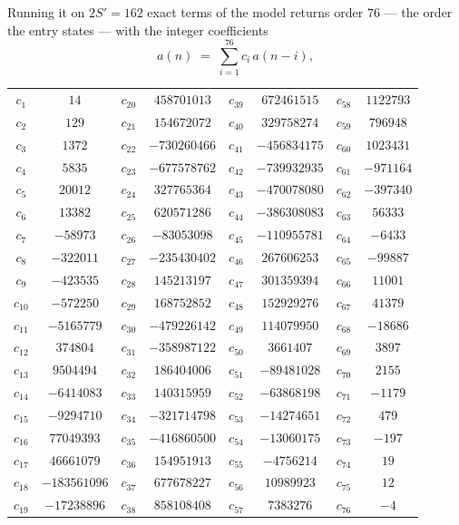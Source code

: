 \documentclass[11pt,a4paper]{article}
\theoremstyle{plain}
\theoremstyle{definition}
\begin{document}
Running it on $2S'=162$ exact terms of the model returns order $76$ --- the order the
entry states --- with the integer coefficients
\[
a(n)\;=\;\sum_{i=1}^{76}c_i\,a(n-i),
\]
\begin{center}\small
\begin{tabular}{cccccccc}
$c_{1}$ & $14$ & $c_{20}$ & $458701013$ & $c_{39}$ & $672461515$ & $c_{58}$ & $1122793$ \\
$c_{2}$ & $129$ & $c_{21}$ & $154672072$ & $c_{40}$ & $329758274$ & $c_{59}$ & $796948$ \\
$c_{3}$ & $1372$ & $c_{22}$ & $-730260466$ & $c_{41}$ & $-456834175$ & $c_{60}$ & $1023431$ \\
$c_{4}$ & $5835$ & $c_{23}$ & $-677578762$ & $c_{42}$ & $-739932935$ & $c_{61}$ & $-971164$ \\
$c_{5}$ & $20012$ & $c_{24}$ & $327765364$ & $c_{43}$ & $-470078080$ & $c_{62}$ & $-397340$ \\
$c_{6}$ & $13382$ & $c_{25}$ & $620571286$ & $c_{44}$ & $-386308083$ & $c_{63}$ & $56333$ \\
$c_{7}$ & $-58973$ & $c_{26}$ & $-83053098$ & $c_{45}$ & $-110955781$ & $c_{64}$ & $-6433$ \\
$c_{8}$ & $-322011$ & $c_{27}$ & $-235430402$ & $c_{46}$ & $267606253$ & $c_{65}$ & $-99887$ \\
$c_{9}$ & $-423535$ & $c_{28}$ & $145213197$ & $c_{47}$ & $301359394$ & $c_{66}$ & $11001$ \\
$c_{10}$ & $-572250$ & $c_{29}$ & $168752852$ & $c_{48}$ & $152929276$ & $c_{67}$ & $41379$ \\
$c_{11}$ & $-5165779$ & $c_{30}$ & $-479226142$ & $c_{49}$ & $114079950$ & $c_{68}$ & $-18686$ \\
$c_{12}$ & $374804$ & $c_{31}$ & $-358987122$ & $c_{50}$ & $3661407$ & $c_{69}$ & $3897$ \\
$c_{13}$ & $9504494$ & $c_{32}$ & $186404006$ & $c_{51}$ & $-89481028$ & $c_{70}$ & $2155$ \\
$c_{14}$ & $-6414083$ & $c_{33}$ & $140315959$ & $c_{52}$ & $-63868198$ & $c_{71}$ & $-1179$ \\
$c_{15}$ & $-9294710$ & $c_{34}$ & $-321714798$ & $c_{53}$ & $-14274651$ & $c_{72}$ & $479$ \\
$c_{16}$ & $77049393$ & $c_{35}$ & $-416860500$ & $c_{54}$ & $-13060175$ & $c_{73}$ & $-197$ \\
$c_{17}$ & $46661079$ & $c_{36}$ & $154951913$ & $c_{55}$ & $-4756214$ & $c_{74}$ & $19$ \\
$c_{18}$ & $-183561096$ & $c_{37}$ & $677678227$ & $c_{56}$ & $10989923$ & $c_{75}$ & $12$ \\
$c_{19}$ & $-17238896$ & $c_{38}$ & $858108408$ & $c_{57}$ & $7383276$ & $c_{76}$ & $-4$ \\
\end{tabular}
\end{center}
\end{document}
